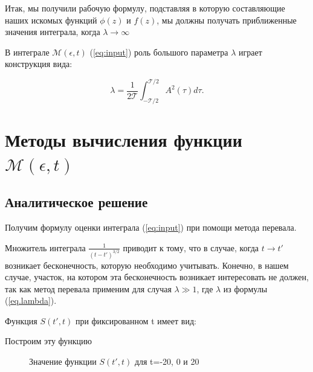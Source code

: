 \documentclass[14pt, a4paper]{article}
\numberwithin{figure}{section}
\numberwithin{equation}{section}
\newcommand{\sectionbreak}{\clearpage}
\newcommand{\cM}{\mathcal{M}}
\newcommand{\cT}{\mathcal{T}}
\begin{document}
Итак, мы получили рабочую формулу, подставляя в которую составляющие наших искомых функций $\phi (z)$ и $f (z)$, мы должны получать приближенные значения интеграла, когда $\lambda \rightarrow \infty$ 

В интеграле $\cM(\epsilon,t)$ (\ref{eq:input}) роль большого параметра $\lambda$ играет конструкция вида:

\begin{equation}\label{eq.lambda}
\lambda = \frac{1}{2 \cT} \int_{-\cT/2}^{\cT/2} A^2(\tau) d\tau.
\end{equation}

\sectionbreak
\section{Методы вычисления функции $\cM(\epsilon,t)$}
\subsection{Аналитическое решение}
Получим формулу оценки интеграла (\ref{eq:input}) при помощи метода перевала.

Множитель интеграла $\frac{1}{(t-t')^{3/2}}$ приводит к тому, что в случае, когда $t \rightarrow t'$ возникает бесконечность, которую  необходимо учитывать. Конечно, в нашем случае, участок, на котором эта бесконечность возникает интересовать не должен, так как метод перевала применим для случая $\lambda \gg 1$, где $\lambda$ из формулы (\ref{eq.lambda}).  

Функция $S(t', t)$ при фиксированном t имеет вид:

Построим эту функцию 

\begin{figure}[h]
	\caption{Значение функции $S(t', t)$ для t=-20, 0 и 20}
	\label{ris:S}
\end{figure}
\end{document}
